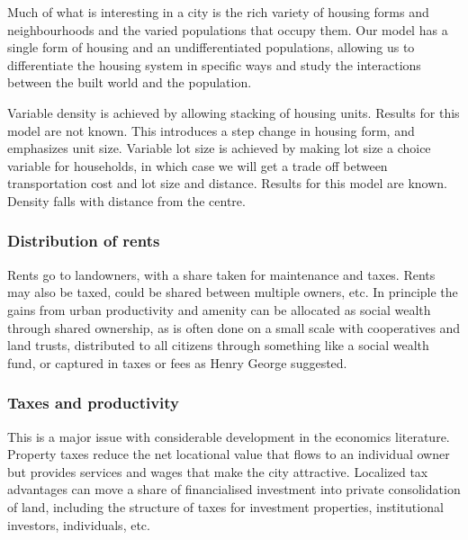 Much of what is interesting in a city is the rich variety of housing forms and neighbourhoods and the varied populations that occupy them. Our model has a single form of housing and an undifferentiated populations, allowing us to differentiate the housing system in specific ways and study the interactions between the built world and the population.

Variable density is achieved by allowing stacking of housing units. Results for this model are not known. This introduces a step change in housing form, and emphasizes unit size. Variable lot size is achieved by making lot size a choice variable for households, in which case we will get a trade off between transportation cost and lot size and distance. Results for this model are known. Density falls with distance from the centre. 


\subsubsection{Distribution of rents}
Rents go to landowners, with a share taken for maintenance and taxes.
Rents may also be taxed, could be shared between multiple owners, etc.
In principle the gains from urban productivity and amenity can be allocated as social wealth through shared ownership, as is often done on a small scale with cooperatives and land trusts, distributed to all citizens through something like a social wealth fund, or captured in taxes or fees as Henry George suggested. 

\subsubsection{Taxes and productivity} %
This is a major issue with considerable development in the economics literature. Property taxes reduce the net locational value that flows to an individual owner but provides services and wages that make the city attractive. 
Localized tax advantages can move a share of financialised investment into private consolidation of land, 
including the structure of taxes for investment properties, institutional investors, individuals, etc.

